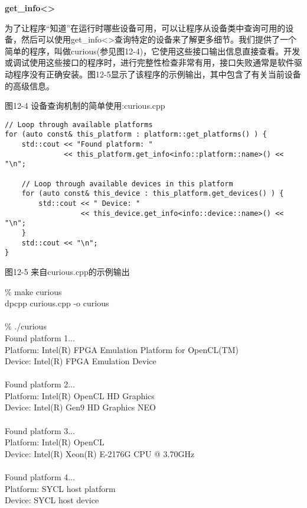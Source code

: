 \hspace*{\fill} \par %
\textbf{get\_info<>}

为了让程序“知道”在运行时哪些设备可用，可以让程序从设备类中查询可用的设备，然后可以使用get\_info<>查询特定的设备来了解更多细节。我们提供了一个简单的程序，叫做curious(参见图12-4)，它使用这些接口输出信息直接查看。开发或调试使用这些接口的程序时，进行完整性检查非常有用，接口失败通常是软件驱动程序没有正确安装。图12-5显示了该程序的示例输出，其中包含了有关当前设备的高级信息。\par

\hspace*{\fill} \par %
图12-4 设备查询机制的简单使用:curious.cpp
\begin{lstlisting}[caption={}]
// Loop through available platforms
for (auto const& this_platform : platform::get_platforms() ) {
	std::cout << "Found platform: "
			  << this_platform.get_info<info::platform::name>() << "\n";
	
	// Loop through available devices in this platform
	for (auto const& this_device : this_platform.get_devices() ) {
		std::cout << " Device: "
				  << this_device.get_info<info::device::name>() << "\n";
	}
	std::cout << "\n";
}
\end{lstlisting}

\hspace*{\fill} \par %
图12-5 来自curious.cpp的示例输出
\begin{tcolorbox}[colback=white,colframe=black]
\% make curious \\
dpcpp curious.cpp -o curious\\
\\
\% ./curious \\
Found platform 1...\\
Platform: Intel(R) FPGA Emulation Platform for OpenCL(TM)\\
Device: Intel(R) FPGA Emulation Device\\
\\
Found platform 2...\\
Platform: Intel(R) OpenCL HD Graphics\\
Device: Intel(R) Gen9 HD Graphics NEO\\
\\
Found platform 3...\\
Platform: Intel(R) OpenCL\\
Device: Intel(R) Xeon(R) E-2176G CPU @ 3.70GHz\\
\\
Found platform 4...\\
Platform: SYCL host platform\\
Device: SYCL host device
\end{tcolorbox}

